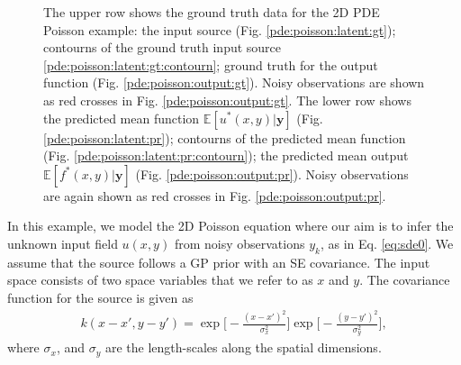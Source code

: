\documentclass[journal]{IEEEtran}
\begin{document}
\begin{figure}[!ht]
{         }

     \caption{The upper row shows the ground truth data for the 2D PDE Poisson example: the input source
       (Fig. \ref{pde:poisson:latent:gt}); contourns of the ground truth input source
       \ref{pde:poisson:latent:gt:contourn}; ground truth for the output function
       (Fig. \ref{pde:poisson:output:gt}). Noisy observations are shown as red crosses in
       Fig. \ref{pde:poisson:output:gt}. The lower row shows the predicted mean function
       $\mathbb{E}[u^*(x,y)|\mathbf{y}]$ (Fig. \ref{pde:poisson:latent:pr}); contourns of the predicted mean function
       (Fig. \ref{pde:poisson:latent:pr:contourn}); the predicted mean output $\mathbb{E}[f^*(x,y)|\mathbf{y}]$ 
      (Fig. \ref{pde:poisson:output:pr}). Noisy observations are again shown as red crosses in Fig. \ref{pde:poisson:output:pr}. 
     }
     \label{fig:dummy}
   \end{figure}



In this example, we model the 2D Poisson equation where our aim is to infer the unknown input field $u(x,y)$ from noisy
observations $y_k$, as in Eq. \eqref{eq:sde0}. We assume that the source follows
a GP prior with an SE covariance. The input space consists of two space variables that we refer to as $x$
and $y$. The covariance function for the source is given as
\begin{align*}
k(x-x', y -y') = \exp\Bigg[-\frac{(x-x')^2}{\sigma^2_x}\Bigg]\exp\Bigg[-\frac{(y-y')^2}{\sigma^2_y}\Bigg],
\end{align*}
where $\sigma_x$, and $\sigma_y$ are the length-scales along the
spatial dimensions.
\end{document}

